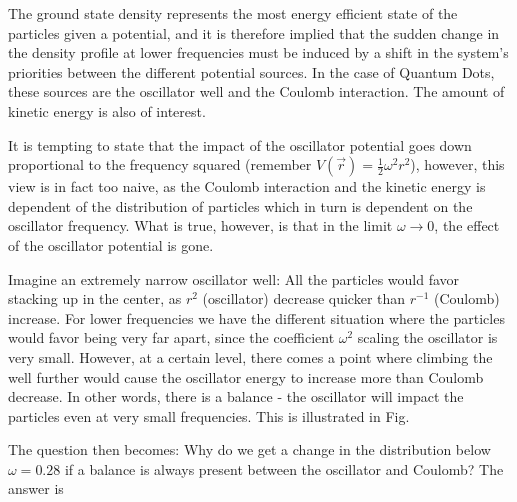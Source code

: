 The ground state density represents the most energy efficient state of the particles given a potential, and it is therefore implied that the sudden change in the density profile at lower frequencies must be induced by a shift in the system's priorities between the different potential sources. In the case of Quantum Dots, these sources are the oscillator well and the Coulomb interaction. The amount of kinetic energy is also of interest.

It is tempting to state that the impact of the oscillator potential goes down proportional to the frequency squared (remember $V(\vec r) = \frac{1}{2}\omega^2r^2$), however, this view is in fact too naive, as the Coulomb interaction and the kinetic energy is dependent of the distribution of particles which in turn is dependent on the oscillator frequency. What is true, however, is that in the limit $\omega\to 0$, the effect of the oscillator potential is gone. 

Imagine an extremely narrow oscillator well: All the particles would favor stacking up in the center, as $r^2$ (oscillator) decrease quicker than $r^{-1}$ (Coulomb) increase. For lower frequencies we have the different situation where the particles would favor being very far apart, since the coefficient $\omega^2$ scaling the oscillator is very small. However, at a certain level, there comes a point where climbing the well further would cause the oscillator energy to increase more than Coulomb decrease. In other words, there is a balance - the oscillator will impact the particles even at very small frequencies. This is illustrated in Fig.

The question then becomes: Why do we get a change in the distribution below $\omega=0.28$ if a balance is always present between the oscillator and Coulomb? The answer is 

